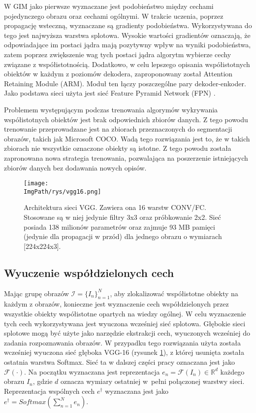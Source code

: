 \documentclass[a4paper,12pt,twoside,openany]{report}
\newcommand{\ImgPath}{.}
\begin{document}
W GIM jako pierwsze wyznaczane jest podobieństwo między cechami pojedynczego obrazu oraz cechami ogólnymi. W trakcie uczenia, poprzez propagację wsteczną, wyznaczane są gradienty podobieństwa. Wykorzystywana do tego jest najwyższa warstwa splotowa. Wysokie wartości gradientów oznaczają, że odpowiadające im postaci jądra mają pozytywny wpływ na wyniki podobieństwa, zatem poprzez zwiększenie wag tych postaci jądra algorytm wybierze cechy związane z współistotnością. Dodatkowo, w celu lepszego opisania współistotnych obiektów w każdym z poziomów dekodera, zaproponowany został Attention Retaining Module (ARM). Moduł ten łączy poszczególne pary dekoder-enkoder. Jako podstawa sieci użyta jest sieć Feature Pyramid Network (FPN) \cite{lin2017feature}.

Problemem występującym podczas trenowania algorymów wykrywania współistotnych obiektów jest brak odpowiednich zbiorów danych. Z tego powodu trenowanie przeprowadzane jest na zbiorach przeznaczonych do segmentacji obrazów, takich jak Microsoft COCO. Wadą tego rozwiązania jest to, że w takich zbiorach nie wszystkie oznaczone obiekty są istotne. Z tego powodu została zapronowana nowa strategia trenowania, pozwalająca na poszerzenie istniejących zbiorów danych bez dodawania nowych opisów. 

\begin{figure}[h]
	\centering
	\texttt{[image: \\ImgPath/rys/vgg16.png]}
	\caption{Architektura sieci VGG. Zawiera ona 16 warstw CONV/FC. Stosowane są w niej jedynie filtry 3x3 oraz próbkowanie 2x2. Sieć posiada 138 milionów parametrów oraz zajmuje 93 MB pamięci (jedynie dla propagacji w przód) dla jednego obrazu o wymiarach [224x224x3].}
	\label{vgg}
\end{figure}


\subsection{Wyuczenie współdzielonych cech}
Mając grupę obrazów $\mathcal{I}=\{I_n\}_{n=1}^N$, aby zlokalizować współistotne obiekty na każdym z obrazów, konieczne jest wyznaczenie cech współdzielonych przez wszystkie obiekty współistotne opartych na wiedzy ogólnej. W celu wyznaczenie tych cech wykorzystywana jest wyuczona wcześniej sieć splotowa. Głębokie sieci splotowe mogą być użyte jako narzędzie ekstrakcji cech, wyuczonych wcześniej do zadania rozpoznawania obrazów. W przypadku tego rozwiązania użyta została wcześniej wyuczona sieć głęboka VGG-16 \cite{SimonyanZ14a} (rysunek \ref{vgg}), z której usunięta została ostatnia warstwa Softmax. Sieć ta w dalszej części pracy oznaczana jest jako $\mathcal{F}(\cdot)$. Na początku wyznaczana jest reprezentacja $e_n=\mathcal{F}(I_n)\in\mathds{R}^d$ każdego obrazu $I_n$, gdzie $d$ oznacza wymiary ostatniej w~pełni połączonej warstwy sieci. Reprezentacja wspólnych cech $e^\dagger$ wyznaczana jest jako $e^\dagger = Softmax\left(\sum^{N}_{n=1}e_n\right)$.
\end{document}

